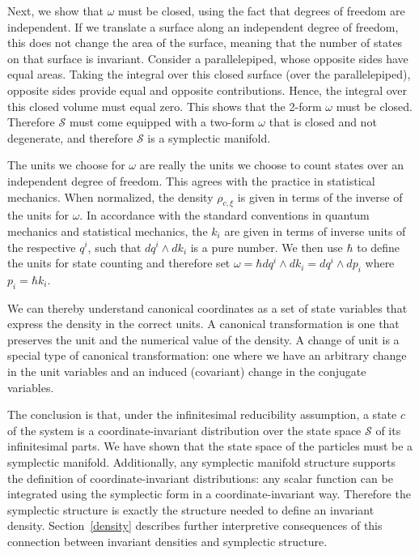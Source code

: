 \documentclass[letterpaper]{article}
\begin{document}
Next, we show that $\omega$ must be closed, using the fact that degrees of freedom are independent. If we translate a surface along an independent degree of freedom, this does not change the area of the surface, meaning that the number of states on that surface is invariant. Consider a parallelepiped, whose opposite sides have equal areas. Taking the integral over this closed surface (over the parallelepiped), opposite sides provide equal and opposite contributions. Hence, the integral over this closed volume must equal zero. This shows that the 2-form $\omega$ must be closed. Therefore $\mathcal{S}$ must come equipped with a two-form $\omega$ that is closed and not degenerate, and therefore $\mathcal{S}$ is a symplectic manifold.

The units we choose for $\omega$ are really the units we choose to count states over an independent degree of freedom. This agrees with the practice in statistical mechanics. When normalized, the density $\rho_{c, \xi}$ is given in terms of the inverse of the units for $\omega$. In accordance with the standard conventions in quantum mechanics and statistical mechanics, the $k_i$ are given in terms of inverse units of the respective $q^i$, such that $dq^i \wedge dk_i$ is a pure number. We then use $\hbar$ to define the units for state counting and therefore set $\omega = \hbar dq^i \wedge dk_i = dq^i \wedge dp_i$ where $p_i = \hbar k_i$.

We can thereby understand canonical coordinates as a set of state variables that express the density in the correct units. A canonical transformation is one that preserves the unit and the numerical value of the density. A change of unit is a special type of canonical transformation: one where we have an arbitrary change in the unit variables and an induced (covariant) change in the conjugate variables.

The conclusion is that, under the infinitesimal reducibility assumption, a state $c$ of the system is a coordinate-invariant distribution over the state space $\mathcal{S}$ of its infinitesimal parts. We have shown that the state space of the particles must be a symplectic manifold. Additionally, any symplectic manifold structure supports the definition of coordinate-invariant distributions: any scalar function can be integrated using the symplectic form in a coordinate-invariant way. Therefore the symplectic structure is exactly the structure needed to define an invariant density. Section~\ref{density} describes further interpretive consequences of this connection between invariant densities and symplectic structure.
\end{document}
